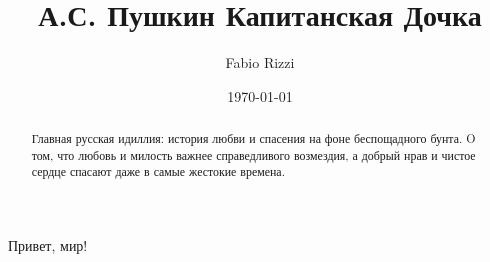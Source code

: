 \documentclass[a4paper,12pt]{article}
\author{Fabio Rizzi}
\title{А.С. Пушкин Капитанская Дочка}
\date{\today}
\begin{document}

\maketitle
\begin{abstract}
    Главная русская идиллия: история любви и спасения на фоне беспощадного бунта.
O том, что любовь и милость важнее справедливого возмездия, а добрый нрав и чистое сердце спасают даже в самые жестокие времена.
\end{abstract}

Привет, мир!
\end{document}
